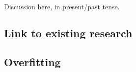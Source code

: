 Discussion here, in present/past tense.


\subsection{Link to existing research}

\subsection{Overfitting}